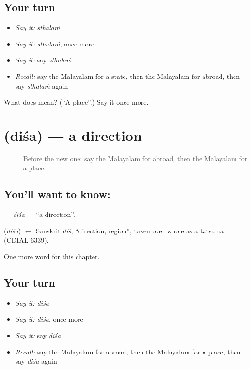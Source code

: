 \subsection*{Your turn}
\begin{itemize}
\raggedright
  \item \emph{Say it:} \emph{sthalaṁ}
  \item \emph{Say it:} \emph{sthalaṁ}, once more
  \item \emph{Say it:} say \emph{sthalaṁ}
  \item \emph{Recall:} say the Malayalam for a state, then the Malayalam for abroad, then say \emph{sthalaṁ} again
\end{itemize}

\begin{tcolorbox}[breakable,colback=teal!4,colframe=teal!35!black,title={Before you move on}]
What does  mean? (\textquotedblleft{}A place\textquotedblright{}.) Say it once more.
\end{tcolorbox}
\section[\texorpdfstring{\ml{ദിശ} (diśa)}{ദിശ (diśa)}]{ (diśa) — a direction}

\label{lesson:ML-C315-disa}



\begin{quote}
Before the new one: say the Malayalam for abroad, then the Malayalam for a place.
\end{quote}

\subsection*{You'll want to know: }
\textbf{} — \emph{diśa} — \textquotedblleft{}a direction\textquotedblright{}.

\begin{cousinweb}
\textbf{} (\emph{diśa}) $\leftarrow$ Sanskrit \emph{diś}, \textquotedblleft{}direction, region\textquotedblright{}, taken over whole as a tatsama (CDIAL 6339).
\end{cousinweb}

\begin{grammarlens}[title={What you've built}]
One more word for this chapter.
\end{grammarlens}

\subsection*{Your turn}
\begin{itemize}
\raggedright
  \item \emph{Say it:} \emph{diśa}
  \item \emph{Say it:} \emph{diśa}, once more
  \item \emph{Say it:} say \emph{diśa}
  \item \emph{Recall:} say the Malayalam for abroad, then the Malayalam for a place, then say \emph{diśa} again
\end{itemize}

